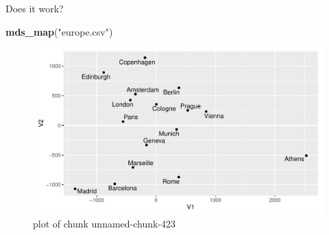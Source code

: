 \documentclass[ignorenonframetext,]{beamer}
\newenvironment{Shaded}{\begin{snugshade}}{\end{snugshade}}
\newcommand{\KeywordTok}[1]{\textcolor[rgb]{0.13,0.29,0.53}{\textbf{#1}}}
\newcommand{\NormalTok}[1]{#1}
\newcommand{\StringTok}[1]{\textcolor[rgb]{0.31,0.60,0.02}{#1}}
\begin{document}
\begin{frame}[fragile]{Does it work?}
\protect\hypertarget{does-it-work}{}

\begin{Shaded}
\begin{Highlighting}[]
\KeywordTok{mds_map}\NormalTok{(}\StringTok{"europe.csv"}\NormalTok{)}
\end{Highlighting}
\end{Shaded}

\begin{figure}
\centering
\includegraphics{figure/unnamed-chunk-423-1.pdf}
\caption{plot of chunk unnamed-chunk-423}
\end{figure}

\end{frame}
\end{document}
